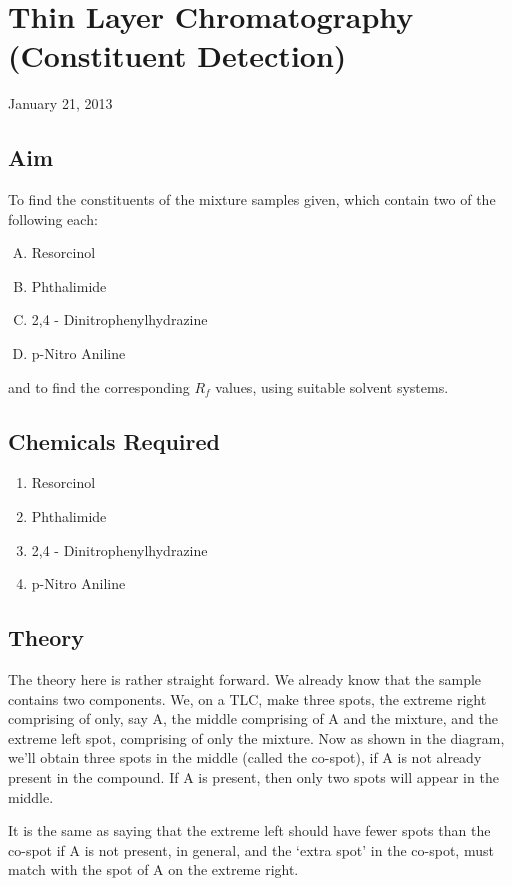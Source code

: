\chapter{Thin Layer Chromatography (Constituent Detection)}
\begin{flushright}
January 21, 2013
\end{flushright}
\section{Aim}
To find the constituents of the mixture samples given, which contain two of the following each: 
\begin{enumerate}[A)]
	\item Resorcinol
	\item Phthalimide
	\item 2,4 - Dinitrophenylhydrazine
	\item p-Nitro Aniline
\end{enumerate}
and to find the corresponding $R_f$ values, using suitable solvent systems.

\section {Chemicals Required}
	\begin{enumerate}
		\item Resorcinol
		\item Phthalimide
		\item 2,4 - Dinitrophenylhydrazine
		\item p-Nitro Aniline
	\end{enumerate}

\section{Theory}
	The theory here is rather straight forward. We already know that the sample contains two components. We, on a TLC, make three spots, the extreme right comprising of only, say A, the middle comprising of A and the mixture, and the extreme left spot, comprising of only the mixture. Now as shown in the diagram, we'll obtain three spots in the middle (called the co-spot), if A is not already present in the compound. If A is present, then only two spots will appear in the middle.\par
	It is the same as saying that the extreme left should have fewer spots than the co-spot if A is not present, in general, and the `extra spot' in the co-spot, must match with the spot of A on the extreme right.

